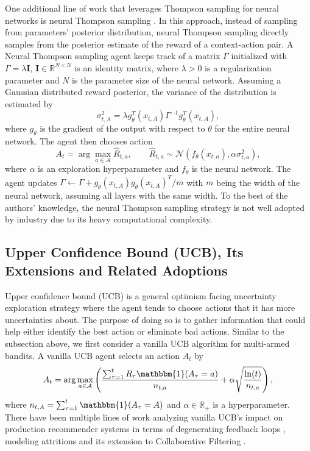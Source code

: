 One additional line of work that leverages Thompson sampling for neural networks is neural Thompson sampling \cite{zhang2021neural}. In this approach, instead of sampling from parameters' posterior distribution, neural Thompson sampling directly samples from the posterior estimate of the reward of a context-action pair. A Neural Thompson sampling agent keeps track of a matrix $\Gamma$ initialized with $\Gamma = \lambda \mathbf{I}$, $\mathbf{I} \in \mathbb{R}^{N \times N}$ is an identity matrix, where $\lambda > 0$ is a regularization parameter and $N$ is the parameter size of the neural network. Assuming a Gaussian distributed reward posterior, the variance of the distribution is estimated by
\begin{equation}
    \sigma^2_{t, A} = \lambda g_{\theta}^T(x_{t, A})\Gamma^{-1}g_{\theta}^T(x_{t, A}),
\end{equation}
where $g_\theta$ is the gradient of the output with respect to $\theta$ for the entire neural network. The agent then chooses action
\begin{equation}
    A_t = \arg\max_{a \in \mathcal{A}}\hat{R}_{t, a}, \qquad \hat{R}_{t, a} \sim \mathcal{N}(f_{\theta}(x_{t, a}), \alpha \sigma^2_{t, a}),
\end{equation}
where $\alpha$ is an exploration hyperparameter and $f_{\theta}$ is the neural network. The agent updates $\Gamma \leftarrow \Gamma + g_{\theta}(x_{t, A})g_{\theta}(x_{t, A})^T / m$ with $m$ being the width of the neural network, assuming all layers with the same width. To the best of the authors' knowledge, the neural Thompson sampling strategy is not well adopted by industry due to its heavy computational complexity. 

\subsection{Upper Confidence Bound (UCB), Its Extensions and Related Adoptions}
Upper confidence bound (UCB) is a general optimism facing uncertainty exploration strategy where the agent tends to choose actions that it has more uncertainties about. The purpose of doing so is to gather information that could help either identify the best action or eliminate bad actions. Similar to the subsection above, we first consider a vanilla UCB algorithm \cite{agrawal1995sample, auer2002finite} for multi-armed bandits. A vanilla UCB agent selects an action $A_t$ by 
\begin{equation}
    A_t = \arg\max_{a \in \mathcal{A}} \left(\frac{\sum_{\tau=1}^{t} R_\tau \mathbbm{1}(A_\tau = a)}{n_{t, a}} + \alpha\sqrt{\frac{\ln(t)}{n_{t, a}}}\right),
\end{equation}
where $n_{t, A} = \sum_{\tau = 1}^t \mathbbm{1}(A_\tau = A)$ and $\alpha \in \mathbb{R_+}$ is a hyperparameter. There have been multiple lines of work analyzing vanilla UCB's impact on production recommender systems in terms of degenerating feedback loops \cite{jiang2019degenerate, Guo2023evaluate}, modeling attritions \cite{ben2022modeling} and its extension to Collaborative Filtering \cite{nakamura2015ucb}.

